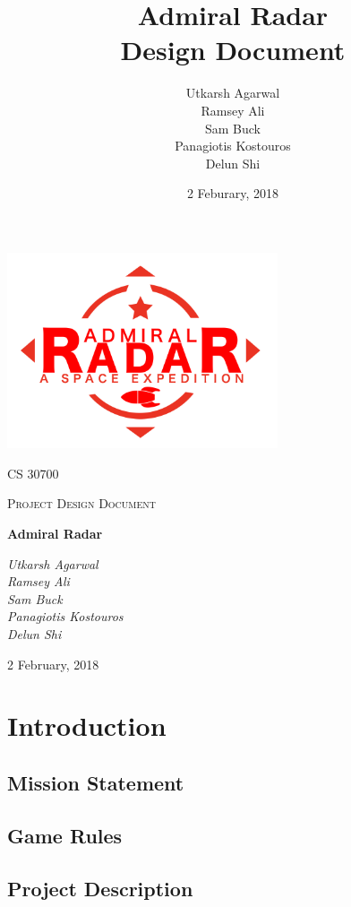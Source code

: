 \documentclass[12pt]{article}
\title{ Admiral Radar \\ \large Design Document}
\author{Utkarsh Agarwal\\ Ramsey Ali \\ Sam Buck \\ Panagiotis Kostouros \\ Delun Shi }
\date{2 Feburary, 2018}
\begin{document}
\begin{titlepage}
	\centering
	\includegraphics[width=0.6\textwidth]{logo}\par\vspace{1cm}
	{\scshape\LARGE CS 30700 \par}
	{\scshape\Large Project Design Document\par}
	\vspace{1.5cm}
	{\Huge\bfseries Admiral Radar\par}
	\vspace{2cm}
	{\Large\itshape Utkarsh Agarwal\\ Ramsey Ali \\ Sam Buck \\ Panagiotis Kostouros \\ Delun Shi \par}

	\vfill
	{\large 2 February, 2018 \par}
\end{titlepage}

\tableofcontents

\section{Introduction}
\subsection{Mission Statement}


\subsection{Game Rules}


\subsection{Project Description}

\end{document}
